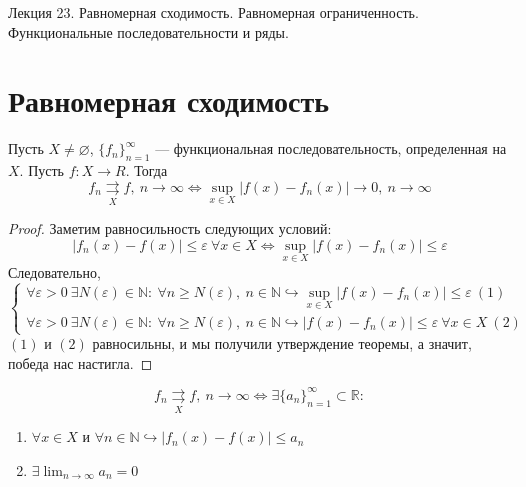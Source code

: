 \documentclass[11pt]{article}
\begin{document}
\begin{titlepage}
    \centering
    \vspace*{\fill}  %

    {\Huge Лекция 23. Равномерная сходимость. Равномерная ограниченность. Функциональные последовательности и ряды. \par}

    \vspace*{\fill}  %
\end{titlepage}

\setcounter{page}{1}

\section{Равномерная сходимость}

\begin{theorem} \label{eq:theorem 1.1}
    Пусть $X \neq \varnothing$, $\{f_n\}_{n = 1}^\infty$ --- функциональная последовательность, определенная на $X$. Пусть $f:X \to R$. Тогда 
    \[f_n \underset{X}{\rightrightarrows} f, \ n \to \infty \Longleftrightarrow \sup_{x \in X} \left|f(x) - f_n(x)\right| \to 0, \ n \to \infty\]
\end{theorem}

\begin{proof}
    Заметим равносильность следующих условий: \[ \left|f_n(x) - f(x)\right| \leq \varepsilon \ \forall x \in X \Longleftrightarrow \sup_{x \in X} \left|f(x) - f_n(x)\right|
    \leq \varepsilon\] Следовательно, \[ \left\{ \begin{array}{l}
        \displaystyle \forall \varepsilon > 0 \ \exists N(\varepsilon) \in \mathbb{N}: \ \forall n \geq N(\varepsilon), \ n \in \mathbb{N} \hookrightarrow \sup_{x \in X} 
        \left|f(x) - f_n(x)\right| \leq \varepsilon \ (1) \\
        \displaystyle \forall \varepsilon > 0 \ \exists N(\varepsilon) \in \mathbb{N}: \ \forall n \geq N(\varepsilon), \ n \in \mathbb{N} \hookrightarrow \left|f(x) - f_n(x)\right| 
        \leq \varepsilon \ \forall x \in X \ (2)
    \end{array} \right.\ \]
    $(1)$ и $(2)$ равносильны, и мы получили утверждение теоремы, а значит, победа нас настигла.
\end{proof}

\begin{consequence}
    \[f_n \underset{X}{\rightrightarrows} f, \ n \to \infty \Longleftrightarrow \exists \{a_n\}_{n = 1}^\infty \subset \mathbb{R}:\] 
    \begin{enumerate}
        \item $\forall x \in X \text{ и } \forall n \in \mathbb{N} \hookrightarrow \left|f_n(x) - f(x)\right| \leq a_n$
        \item $\displaystyle \exists \lim_{n \to \infty} a_n = 0$
    \end{enumerate} 
\end{consequence}
\end{document}
